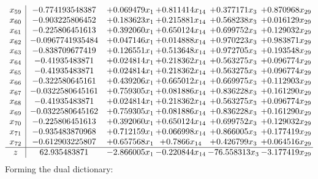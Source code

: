 \documentclass[11pt]{article}
\begin{document}
\[\begin{array}{c| c c@{\hskip 2pt} c@{\hskip 2pt} c@{\hskip 2pt} c@{\hskip 2pt} }
 x_{59}   &  -0.774193548387 & + 0.069479 x_{1} & + 0.811414 x_{14} & + 0.377171 x_{3} & + 0.870968 x_{29}\\
 x_{60}   &  -0.903225806452 & + 0.183623 x_{1} & + 0.215881 x_{14} & + 0.568238 x_{3} & + 0.016129 x_{29}\\
 x_{61}   &  -0.225806451613 & + 0.392060 x_{1} & + 0.650124 x_{14} & + 0.699752 x_{3} & + 0.129032 x_{29}\\
 x_{62}   &  -0.0967741935484 & + 0.047146 x_{1} & + 0.014888 x_{14} & + 0.970223 x_{3} & + 0.983871 x_{29}\\
 x_{63}   &  -0.838709677419 & + 0.126551 x_{1} & + 0.513648 x_{14} & + 0.972705 x_{3} & + 0.193548 x_{29}\\
 x_{64}   &  -0.41935483871 & + 0.024814 x_{1} & + 0.218362 x_{14} & + 0.563275 x_{3} & + 0.096774 x_{29}\\
 x_{65}   &  -0.41935483871 & + 0.024814 x_{1} & + 0.218362 x_{14} & + 0.563275 x_{3} & + 0.096774 x_{29}\\
 x_{66}   &  -0.322580645161 & + 0.439206 x_{1} & + 0.665012 x_{14} & + 0.669975 x_{3} & + 0.112903 x_{29}\\
 x_{67}   &  -0.0322580645161 & + 0.759305 x_{1} & + 0.081886 x_{14} & + 0.836228 x_{3} & + 0.161290 x_{29}\\
 x_{68}   &  -0.41935483871 & + 0.024814 x_{1} & + 0.218362 x_{14} & + 0.563275 x_{3} & + 0.096774 x_{29}\\
 x_{69}   &  -0.0322580645162 & + 0.759305 x_{1} & + 0.081886 x_{14} & + 0.836228 x_{3} & + 0.161290 x_{29}\\
 x_{70}   &  -0.225806451613 & + 0.392060 x_{1} & + 0.650124 x_{14} & + 0.699752 x_{3} & + 0.129032 x_{29}\\
 x_{71}   &  -0.935483870968 & + 0.712159 x_{1} & + 0.066998 x_{14} & + 0.866005 x_{3} & + 0.177419 x_{29}\\
 x_{72}   &  -0.612903225807 & + 0.657568 x_{1} & + 0.7866 x_{14} & + 0.426799 x_{3} & + 0.064516 x_{29}\\
\hline
z    &  62.935483871 & -2.866005 x_{1} & -0.220844 x_{14} & -76.558313 x_{3} & -3.177419 x_{29}\\
\end{array}\]
Forming the dual dictionary:
\end{document}
